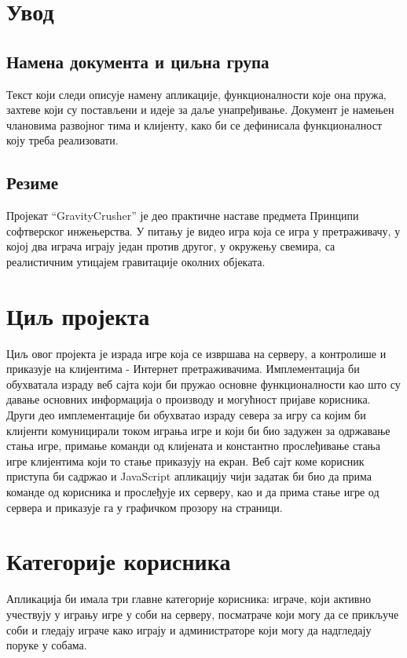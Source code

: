 \section{Увод}

\subsection{Намена документа и циљна група}
Текст који следи описује намену апликације, функционалности које она пружа, захтеве који су постављени и идеје за 
даље унапређивање. Документ је намењен члановима развојног тима и клијенту, како би се дефинисала функционалност
коју треба  реализовати.

\subsection{Резиме}
Пројекат “GravityCrusher” је део практичне наставе предмета Принципи софтверског инжењерства. У питању је 
видео игра која се игра у претраживачу, у којој два играча играју један против другог, у окружењу свемира,
са реалистичним утицајем гравитације околних објеката.



\section{Циљ пројекта}
Циљ овог пројекта је израда игре која се извршава на серверу, а контролише и приказује на 
клијентима - Интернет претраживачима. Имплементација би обухватала израду веб сајта који би пружао основне 
функционалности као што су давање основних информација о производу и могућност пријаве корисника. 
Други део имплементације би обухватао израду севера за игру са којим би клијенти комуницирали током играња игре
и који би био задужен за одржавање стања игре, примање команди од клијената и константно прослеђивање стања игре
клијентима који то стање приказују на екран. Веб сајт коме корисник приступа би садржао и JavaScript
апликацију чији задатак би био да прима команде од корисника и прослеђује их серверу, 
као и да прима стање игре од сервера и приказује га у графичком прозору на страници.



\section{Категорије корисника}
Апликација би имала три главне категорије корисника: играче, који активно учествују у игрању игре у соби на
серверу, посматраче који могу да се прикључе соби и гледају играче како играју и администраторе који могу да
надгледају поруке у собама.

